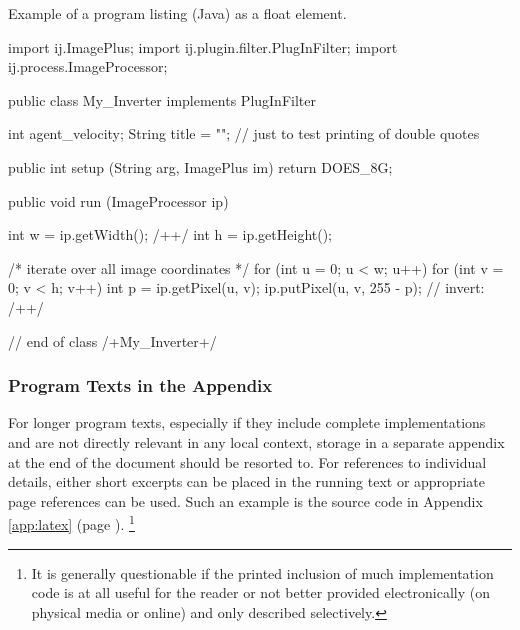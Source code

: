 \begin{program}
\caption{Example of a program listing (Java) as a float element.}
\label{prog:CodeExample}
\begin{JavaCode}
import ij.ImagePlus;
import ij.plugin.filter.PlugInFilter;
import ij.process.ImageProcessor;

public class My_Inverter implements PlugInFilter {
    int agent_velocity;
    String title = ""; // just to test printing of double quotes

    public int setup (String arg, ImagePlus im) {
        return DOES_8G;
    }

    public void run (ImageProcessor ip) {
        int w = ip.getWidth(); /+\label{ExampleCodeLabel}+/
        int h = ip.getHeight();

        /* iterate over all image coordinates */
        for (int u = 0; u < w; u++) {
            for (int v = 0; v < h; v++) {
                int p = ip.getPixel(u, v);
                ip.putPixel(u, v, 255 - p); // invert: /+\label{MathInCode}+/
            }
        }
    }
} // end of class /+My\_Inverter+/
\end{JavaCode}
%
\end{program}

\subsubsection{Program Texts in the Appendix}

For longer program texts, especially if they include complete implementations
and are not directly relevant in any local context, storage in a separate
appendix at the end of the document should be resorted to. For references to
individual details, either short excerpts can be placed in the running text
or appropriate page references can be used. Such an example is the \latex
source code in Appendix \ref{app:latex} (page \pageref{app:latex}).%
\footnote{It is generally questionable if the printed inclusion of 
much implementation code is at all useful for the reader or not better
provided electronically (on physical media or online) and only described
selectively.}

